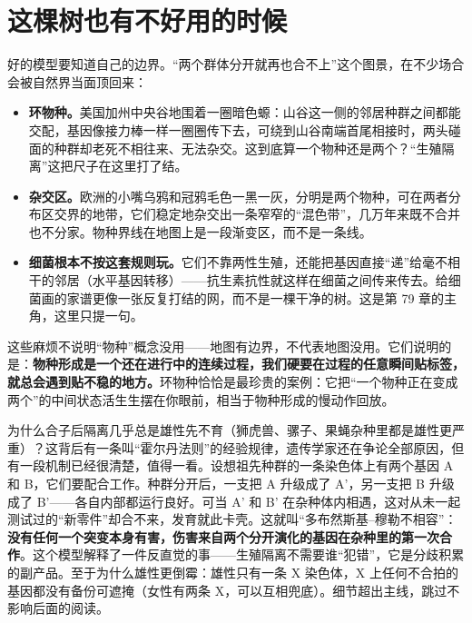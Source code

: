 \section{这棵树也有不好用的时候}

好的模型要知道自己的边界。“两个群体分开就再也合不上”这个图景，在不少场合会被自然界当面顶回来：

\begin{itemize}[itemsep=2pt]
\item \textbf{环物种。}美国加州中央谷地围着一圈暗色螈：山谷这一侧的邻居种群之间都能交配，基因像接力棒一样一圈圈传下去，可绕到山谷南端首尾相接时，两头碰面的种群却老死不相往来、无法杂交。这到底算一个物种还是两个？“生殖隔离”这把尺子在这里打了结。
\item \textbf{杂交区。}欧洲的小嘴乌鸦和冠鸦毛色一黑一灰，分明是两个物种，可在两者分布区交界的地带，它们稳定地杂交出一条窄窄的“混色带”，几万年来既不合并也不分家。物种界线在地图上是一段渐变区，而不是一条线。
\item \textbf{细菌根本不按这套规则玩。}它们不靠两性生殖，还能把基因直接“递”给毫不相干的邻居（水平基因转移）——抗生素抗性就这样在细菌之间传来传去。给细菌画的家谱更像一张反复打结的网，而不是一棵干净的树。这是第 79 章的主角，这里只提一句。
\end{itemize}

这些麻烦不说明“物种”概念没用——地图有边界，不代表地图没用。它们说明的是：\textbf{物种形成是一个还在进行中的连续过程，我们硬要在过程的任意瞬间贴标签，就总会遇到贴不稳的地方。}环物种恰恰是最珍贵的案例：它把“一个物种正在变成两个”的中间状态活生生摆在你眼前，相当于物种形成的慢动作回放。

\begin{tiaozhan}
为什么合子后隔离几乎总是雄性先不育（狮虎兽、骡子、果蝇杂种里都是雄性更严重）？这背后有一条叫“霍尔丹法则”的经验规律，遗传学家还在争论全部原因，但有一段机制已经很清楚，值得一看。设想祖先种群的一条染色体上有两个基因 A 和 B，它们要配合工作。种群分开后，一支把 A 升级成了 A'，另一支把 B 升级成了 B'——各自内部都运行良好。可当 A' 和 B' 在杂种体内相遇，这对从未一起测试过的“新零件”却合不来，发育就此卡壳。这就叫“多布然斯基–穆勒不相容”：\textbf{没有任何一个突变本身有害，伤害来自两个分开演化的基因在杂种里的第一次合作}。这个模型解释了一件反直觉的事——生殖隔离不需要谁“犯错”，它是分歧积累的副产品。至于为什么雄性更倒霉：雄性只有一条 X 染色体，X 上任何不合拍的基因都没有备份可遮掩（女性有两条 X，可以互相兜底）。细节超出主线，跳过不影响后面的阅读。
\end{tiaozhan}

